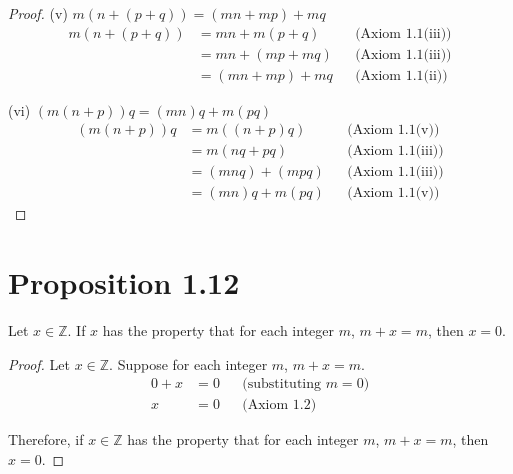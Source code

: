 \begin{proof}
    (v) $m(n + (p + q)) = (mn + mp) + mq$
    \begin{align*}
        m(n + (p + q)) & = mn + m(p + q)  &  & \text{(Axiom 1.1(iii))} \\
                       & = mn + (mp + mq) &  & \text{(Axiom 1.1(iii))} \\
                       & = (mn + mp) + mq &  & \text{(Axiom 1.1(ii))}
    \end{align*}

    (vi) $(m(n + p))q = (mn)q + m(pq)$
    \begin{align*}
        (m(n + p))q & = m((n + p)q)   &  & \text{(Axiom 1.1(v))}   \\
                    & = m(nq + pq)    &  & \text{(Axiom 1.1(iii))} \\
                    & = (mnq) + (mpq) &  & \text{(Axiom 1.1(iii))} \\
                    & = (mn)q + m(pq) &  & \text{(Axiom 1.1(v))}
    \end{align*}
\end{proof}

\section*{Proposition 1.12}
Let $x \in \mathbb{Z}$. If $x$ has the property that for each integer $m$, $m+x = m$, then $x = 0$.
\begin{proof}
    Let $x \in \mathbb{Z}$. Suppose for each integer $m$, $m + x = m$.
    \begin{align*}
        0 + x & = 0 &  & \text{(substituting $m = 0$)} \\
        x     & = 0 &  & \text{(Axiom 1.2)}
    \end{align*}

    Therefore, if $x \in \mathbb{Z}$ has the property that for each integer $m$, $m + x = m$, then $x = 0$.
\end{proof}


